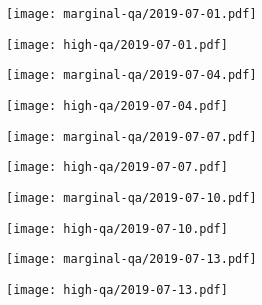 \documentclass{article}
\begin{document}
\begin{figure}[H]
	\ContinuedFloat
	\centering
	\begin{subfigure}{0.48\linewidth}
		\texttt{[image: marginal-qa/2019-07-01.pdf]}
	\end{subfigure}
	\begin{subfigure}{0.48\linewidth}
		\texttt{[image: high-qa/2019-07-01.pdf]}
	\end{subfigure}
	\begin{subfigure}{0.48\linewidth}
		\texttt{[image: marginal-qa/2019-07-04.pdf]}
	\end{subfigure}
	\begin{subfigure}{0.48\linewidth}
		\texttt{[image: high-qa/2019-07-04.pdf]}
	\end{subfigure}
	\begin{subfigure}{0.48\linewidth}
		\texttt{[image: marginal-qa/2019-07-07.pdf]}
	\end{subfigure}
	\begin{subfigure}{0.48\linewidth}
		\texttt{[image: high-qa/2019-07-07.pdf]}
	\end{subfigure}
	\begin{subfigure}{0.48\linewidth}
		\texttt{[image: marginal-qa/2019-07-10.pdf]}
	\end{subfigure}
	\begin{subfigure}{0.48\linewidth}
		\texttt{[image: high-qa/2019-07-10.pdf]}
	\end{subfigure}
	\begin{subfigure}{0.48\linewidth}
		\texttt{[image: marginal-qa/2019-07-13.pdf]}
	\end{subfigure}
	\begin{subfigure}{0.48\linewidth}
		\texttt{[image: high-qa/2019-07-13.pdf]}
	\end{subfigure}
\end{figure}
\end{document}
